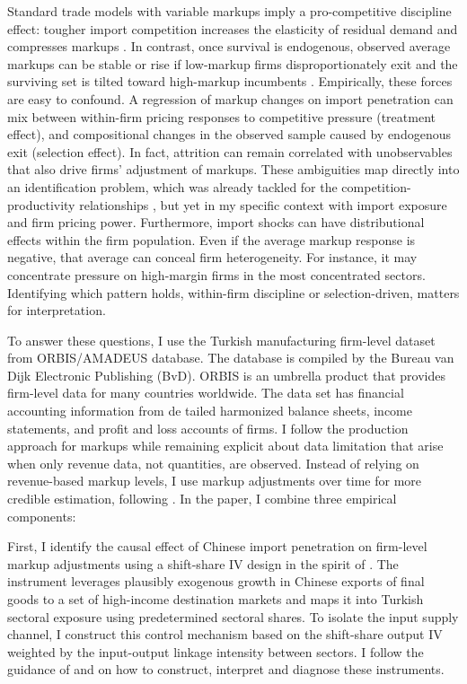 \documentclass[12pt]{article}
\begin{document}
Standard trade models with variable markups imply a pro-competitive discipline effect: tougher import competition increases the elasticity of residual demand and compresses markups \parencite{melitzMarketSizeTrade2008}. In contrast, once survival is endogenous, observed average markups can be stable or rise if low-markup firms disproportionately exit and the surviving set is tilted toward high-markup incumbents \parencite{arkolakisElusiveProCompetitiveEffects2019}. Empirically, these forces are easy to confound. A regression of markup changes on import penetration can mix between within-firm pricing responses to competitive pressure (treatment effect), and compositional changes in the observed sample caused by endogenous exit (selection effect). In fact, attrition can remain correlated with unobservables that also drive firms' adjustment of markups. These ambiguities map directly into an identification problem, which was already tackled for the competition-productivity relationships \parencite{backusWhyProductivityCorrelated2020}, but yet in my specific context with import exposure and firm pricing power. Furthermore, import shocks can have distributional effects within the firm population. Even if the average markup response is negative, that average can conceal firm heterogeneity. For instance, it may concentrate pressure on high-margin firms in the most concentrated sectors. Identifying which pattern holds, within-firm discipline or selection-driven, matters for interpretation.

To answer these questions, I use the Turkish manufacturing firm-level dataset from ORBIS/AMADEUS database. The database is compiled by the Bureau van Dijk Electronic Publishing (BvD). ORBIS is an umbrella product that provides firm-level data for many countries worldwide. The data set has financial accounting information from de tailed harmonized balance sheets, income statements, and profit and loss accounts of firms. I follow the production approach for markups \parencite{deloeckerMarkupsFirmLevelExport2012, hallRelationPriceMarginal1988} while remaining explicit about data limitation that arise when only revenue data, not quantities, are observed. Instead of relying on revenue-based markup levels, I use markup adjustments over time for more credible estimation, following \autocite{deridderHitchhikersGuideMarkup2026}. In the paper, I combine three empirical components:

First, I identify the causal effect of Chinese import penetration on firm-level markup adjustments using a shift-share IV design in the spirit of \autocite{autorChinaSyndromeLocal2013}. The instrument leverages plausibly exogenous growth in Chinese exports of final goods to a set of high-income destination markets and maps it into Turkish sectoral exposure using predetermined sectoral shares. To isolate the input supply channel, I construct this control mechanism based on the shift-share output IV weighted by the input-output linkage intensity between sectors. I follow the guidance of \autocite{borusyakQuasiExperimentalShiftShareResearch2022} and \autocite{goldsmith-pinkhamBartikInstrumentsWhat2020} on how to construct, interpret and diagnose these instruments.
\end{document}
